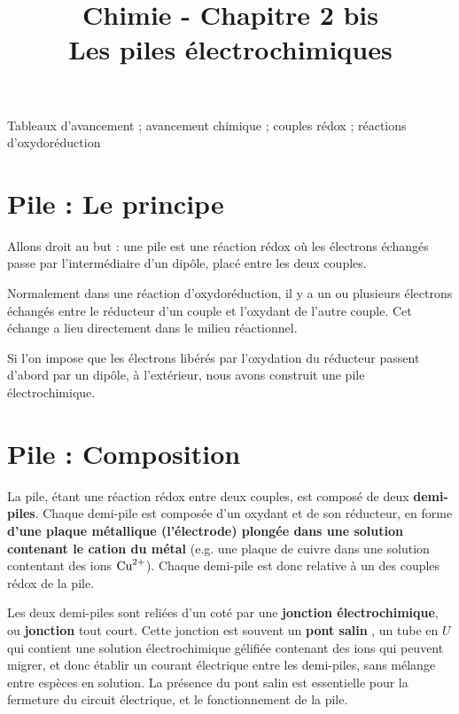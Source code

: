 \documentclass[11pt,a4paper]{article}
\title{\large Chimie - Chapitre 2 bis \\ \LARGE  Les piles électrochimiques \\}
\begin{document}
\maketitle
\vspace{-1cm}

\begin{tcolorbox}[title=Notions de la classe de première à rappeler]
Tableaux d'avancement ; avancement chimique ; couples rédox ; réactions d'oxydoréduction
\end{tcolorbox}
\tableofcontents

\section{Pile : Le principe}
Allons droit au but : une pile  est une réaction rédox où les électrons échangés passe par l'intermédiaire d'un dipôle, placé entre les deux couples. 

Normalement dans une réaction d'oxydoréduction, il y a un ou plusieurs électrons échangés entre le réducteur d'un couple et l'oxydant de l'autre couple. Cet échange a lieu directement dans le milieu réactionnel. 

Si l'on impose que les électrons libérés par l'oxydation du réducteur passent d'abord par un dipôle, à l'extérieur, nous avons construit une pile électrochimique. 


\section{Pile : Composition}

La pile, étant une réaction rédox entre deux couples, est composé de deux \textbf{demi-piles}. 
Chaque demi-pile est composée d'un oxydant et de son réducteur, en forme \textbf{d'une plaque métallique (l'électrode) plongée dans une solution contenant le cation du métal} (e.g. une plaque de cuivre dans une solution contentant des ions $\ce{Cu^2+}$). Chaque demi-pile est donc relative à un des couples rédox de la pile. 

Les deux demi-piles sont reliées d'un coté par une \textbf{jonction électrochimique}, ou \textbf{jonction}  tout court. Cette jonction est souvent un \textbf{pont salin} , un tube en $U$ qui contient une solution électrochimique gélifiée contenant des ions qui peuvent migrer, et donc établir un courant électrique entre les demi-piles, sans mélange entre espèces en solution. La présence du pont salin est essentielle pour la fermeture du circuit électrique, et le fonctionnement de la pile. 
\end{document}
